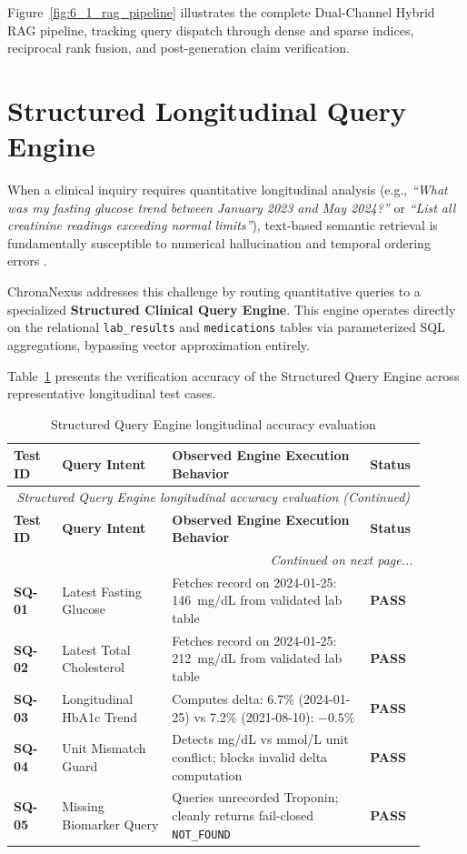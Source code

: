 Figure~\ref{fig:6_1_rag_pipeline} illustrates the complete Dual-Channel Hybrid RAG pipeline, tracking query dispatch through dense and sparse indices, reciprocal rank fusion, and post-generation claim verification.

\section{Structured Longitudinal Query Engine}
\label{sec:structured_query}

When a clinical inquiry requires quantitative longitudinal analysis (e.g., \textit{``What was my fasting glucose trend between January 2023 and May 2024?''} or \textit{``List all creatinine readings exceeding normal limits''}), text-based semantic retrieval is fundamentally susceptible to numerical hallucination and temporal ordering errors \cite{wornow2023shaky,jensen2012mining}.

ChronaNexus addresses this challenge by routing quantitative queries to a specialized \textbf{Structured Clinical Query Engine}. This engine operates directly on the relational \texttt{lab\_results} and \texttt{medications} tables via parameterized SQL aggregations, bypassing vector approximation entirely.

Table~\ref{tab:6_3} presents the verification accuracy of the Structured Query Engine across representative longitudinal test cases.

\small
\begin{longtable}{@{}p{0.11\linewidth} p{0.25\linewidth} p{0.45\linewidth} p{0.09\linewidth}@{}}
\caption{Structured Query Engine longitudinal accuracy evaluation}\label{tab:6_3} \\
\toprule
\textbf{Test ID} & \textbf{Query Intent} & \textbf{Observed Engine Execution Behavior} & \textbf{Status} \\
\midrule
\endfirsthead
\toprule
\multicolumn{4}{c}{\small\textit{Structured Query Engine longitudinal accuracy evaluation (Continued)}} \\[4pt]
\midrule
\textbf{Test ID} & \textbf{Query Intent} & \textbf{Observed Engine Execution Behavior} & \textbf{Status} \\
\midrule
\endhead
\midrule
\multicolumn{4}{r}{\footnotesize\textit{Continued on next page...}} \\
\bottomrule
\endfoot
\bottomrule
\endlastfoot
\textbf{SQ-01} & Latest Fasting Glucose & Fetches record on 2024-01-25: 146~mg/dL from validated lab table & \textbf{PASS} \\
\textbf{SQ-02} & Latest Total Cholesterol & Fetches record on 2024-01-25: 212~mg/dL from validated lab table & \textbf{PASS} \\
\textbf{SQ-03} & Longitudinal HbA1c Trend & Computes delta: 6.7\% (2024-01-25) vs 7.2\% (2021-08-10): $-0.5\%$ & \textbf{PASS} \\
\textbf{SQ-04} & Unit Mismatch Guard & Detects mg/dL vs mmol/L unit conflict; blocks invalid delta computation & \textbf{PASS} \\
\textbf{SQ-05} & Missing Biomarker Query & Queries unrecorded Troponin; cleanly returns fail-closed \texttt{NOT\_FOUND} & \textbf{PASS} \\
\end{longtable}
\normalsize

